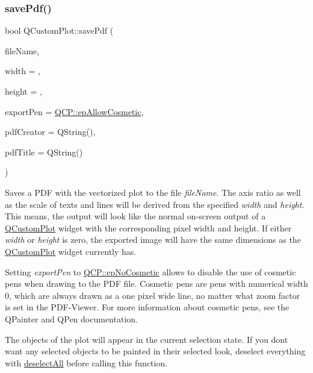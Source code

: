 \subsubsection{\texorpdfstring{savePdf()}{savePdf()}}
{\footnotesize\ttfamily bool Q\+Custom\+Plot\+::save\+Pdf (\begin{DoxyParamCaption}\item[{const Q\+String \&}]{file\+Name,  }\item[{int}]{width = {},  }\item[{int}]{height = {},  }\item[{\mbox{\hyperlink{namespace_q_c_p_a17844f19e1019693a953e1eb93536d2f}{Q\+C\+P\+::\+Export\+Pen}}}]{export\+Pen = {\ttfamily \mbox{\hyperlink{namespace_q_c_p_a17844f19e1019693a953e1eb93536d2fa50d3657dba3fb90560b93a823cb0a6e8}{Q\+C\+P\+::ep\+Allow\+Cosmetic}}},  }\item[{const Q\+String \&}]{pdf\+Creator = {\ttfamily QString()},  }\item[{const Q\+String \&}]{pdf\+Title = {\ttfamily QString()} }\end{DoxyParamCaption})}

Saves a P\+DF with the vectorized plot to the file {\itshape file\+Name}. The axis ratio as well as the scale of texts and lines will be derived from the specified {\itshape width} and {\itshape height}. This means, the output will look like the normal on-\/screen output of a \mbox{\hyperlink{class_q_custom_plot}{Q\+Custom\+Plot}} widget with the corresponding pixel width and height. If either {\itshape width} or {\itshape height} is zero, the exported image will have the same dimensions as the \mbox{\hyperlink{class_q_custom_plot}{Q\+Custom\+Plot}} widget currently has.

Setting {\itshape export\+Pen} to \mbox{\hyperlink{namespace_q_c_p_a17844f19e1019693a953e1eb93536d2faae8fcfaafee234ce18558afef83f6a78}{Q\+C\+P\+::ep\+No\+Cosmetic}} allows to disable the use of cosmetic pens when drawing to the P\+DF file. Cosmetic pens are pens with numerical width 0, which are always drawn as a one pixel wide line, no matter what zoom factor is set in the P\+D\+F-\/\+Viewer. For more information about cosmetic pens, see the Q\+Painter and Q\+Pen documentation.

The objects of the plot will appear in the current selection state. If you don\textquotesingle{}t want any selected objects to be painted in their selected look, deselect everything with \mbox{\hyperlink{class_q_custom_plot_a9d4808ab925b003054085246c92a257c}{deselect\+All}} before calling this function.

